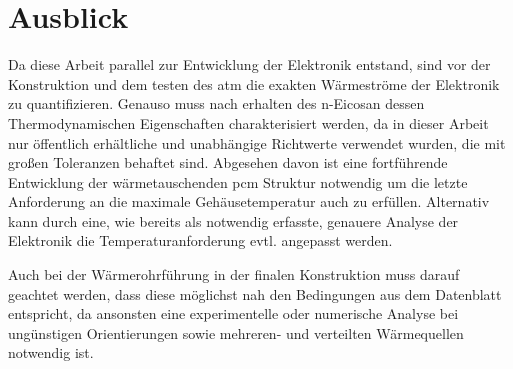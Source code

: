 \chapter{Ausblick}
\label{chap:Ausblick}
\pagestyle{OnlySection}		%

Da diese Arbeit parallel zur Entwicklung der Elektronik entstand, sind vor der Konstruktion und dem testen des \ac{atm} die exakten
Wärmeströme der Elektronik zu quantifizieren. Genauso muss nach erhalten des n-Eicosan dessen Thermodynamischen Eigenschaften charakterisiert werden,
da in dieser Arbeit nur öffentlich erhältliche und unabhängige Richtwerte verwendet wurden, die mit großen Toleranzen behaftet sind.
Abgesehen davon ist eine fortführende Entwicklung der wärmetauschenden \ac{pcm} Struktur notwendig um die letzte Anforderung an die maximale
Gehäusetemperatur auch zu erfüllen. Alternativ kann durch eine, wie bereits als notwendig erfasste, genauere Analyse der Elektronik
die Temperaturanforderung evtl. angepasst werden.

Auch bei der Wärmerohrführung in der finalen Konstruktion muss darauf geachtet werden, dass diese möglichst nah den Bedingungen aus
dem Datenblatt entspricht, da ansonsten eine experimentelle oder numerische Analyse bei ungünstigen Orientierungen sowie mehreren- und verteilten Wärmequellen
notwendig ist.